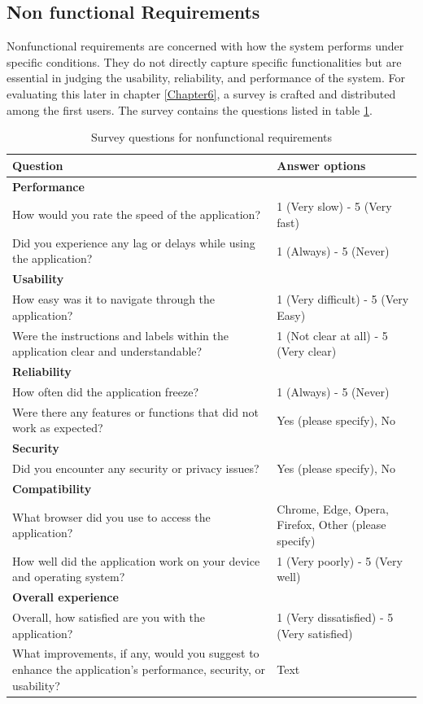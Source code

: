 \subsection{Non functional Requirements}

Nonfunctional requirements are concerned with how the system performs under specific conditions. 
They do not directly capture specific functionalities but are essential in 
judging the usability, reliability, and performance of the system. 
For evaluating this later in chapter \ref{Chapter6}, a survey is crafted and distributed among the first users. 
The survey contains the questions listed in table \ref{tab:non-func-req}.

\begin{table}[!h]
    \centering
    \begin{tabular}{p{8cm} p{6cm}}
    \hline
        \textbf{Question} & \textbf{Answer options} \\ 
     \hline
        \textbf{Performance} & \\
        How would you rate the speed of the application? & 1 (Very slow) - 5 (Very fast) \\
        Did you experience any lag or delays while using the application? & 1 (Always) - 5 (Never) \\
     \hline
        \textbf{Usability} & \\
        How easy was it to navigate through the application? & 1 (Very difficult) - 5 (Very Easy) \\
        Were the instructions and labels within the application clear and understandable? & 1 (Not clear at all) - 5 (Very clear) \\
     \hline
        \textbf{Reliability} & \\
        How often did the application freeze? & 1 (Always) - 5 (Never) \\
        Were there any features or functions that did not work as expected? & Yes (please specify), No \\
     \hline
        \textbf{Security} & \\
        Did you encounter any security or privacy issues? & Yes (please specify), No \\
     \hline
        \textbf{Compatibility} & \\
        What browser did you use to access the application? & Chrome, Edge, Opera, Firefox, Other (please specify) \\
        How well did the application work on your device and operating system? & 1 (Very poorly) - 5 (Very well) \\
     \hline
        \textbf{Overall experience} & \\
        Overall, how satisfied are you with the application? & 1 (Very dissatisfied) - 5 (Very satisfied) \\
        What improvements, if any, would you suggest to enhance the application’s performance, security, or usability? & Text \\
        
    \end{tabular}
    \caption{Survey questions for nonfunctional requirements}
    \label{tab:non-func-req}
\end{table}

